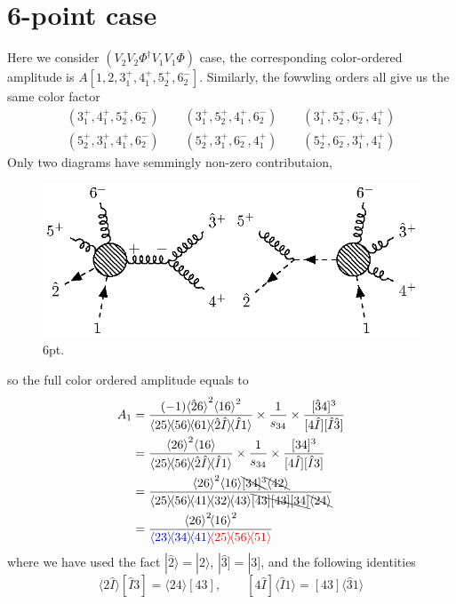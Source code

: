 \documentclass[12pt]{article}
\newcommand{\mdavg}[2]{\langle #1 \rangle\!\langle #2 \rangle}
\newcommand{\avg}[1]{\langle #1 \rangle}
\newcommand{\inavg}[2]{\langle #1 \rangle\! [#2]}
\newcommand{\rinavg}[2]{[#1]\!\langle #2 \rangle}
\newcommand{\aket}[1]{|#1\rangle}
\newcommand{\asqu}[1]{{\langle#1\rangle}^2}
\newcommand{\sket}[1]{|#1]}
\begin{document}
\section{6-point case}
Here we consider $(V_2V_2\Phi^\dagger V_1V_1 \Phi)$ case, the corresponding color-ordered amplitude is $A[1,2,3_1^+,4_1^+,5_2^+,6_2^-]$.
Similarly, the fowwling orders all give us the same color factor
\begin{gather*}
    (3_1^+,4_1^+,5_2^+,6_2^-)\qquad(3_1^+,5_2^+,4_1^+,6_2^-)\qquad (3_1^+,5_2^+,6_2^-,4_1^+)\\
    (5_2^+,3_1^+,4_1^+,6_2^-)\qquad(5_2^+,3_1^+,6_2^-,4_1^+)\qquad (5_2^+,6_2^-,3_1^+,4_1^+)
\end{gather*}
Only two diagrams have semmingly non-zero contributaion,
\par
\begin{figure}[H]
    \centering
    \includegraphics{6pt.eps}
    \caption{6pt.}
    \label{5}
\end{figure}
so the full color ordered amplitude equals to
\begin{align*}
    A_1&=\frac{(-1)\asqu{\hat{2}6}\asqu{16}}{\mdavg{25}{56}\!\avg{61}\!\mdavg{\hat{2}\hat{I}}{\hat{I}1}}\times\frac{1}{s_{34}}\times\frac{[\hat{3}4]^3}{[4\hat{I}][\hat{I}\hat{3}]}\\
    &=\frac{\asqu{26}\avg{16}}{\mdavg{25}{56}\!\mdavg{\hat{2}\hat{I}}{\hat{I}1}}\times\frac{1}{s_{34}}\times\frac{[34]^3}{[4\hat{I}][\hat{I}3]}\\
    &=\frac{\asqu{26}\avg{16}\bcancel{[34]^3}\bcancel{\avg{42}}}{\mdavg{25}{56}\!\mdavg{41}{32}\!\avg{43}\bcancel{[43][43][34]}\bcancel{\avg{24}}}\\
    &=\frac{\asqu{26}\!\asqu{16}}{\textcolor{blue}{\mdavg{23}{34}\!\avg{41}}\!\textcolor{red}{\mdavg{25}{56}\!\avg{51}}}
\end{align*}
where we have used the fact $\aket{\hat{2}}=\aket{2}$, $\sket{\hat{3}}=\sket{3}$, and the following identities
\begin{equation*}
    \inavg{2\hat{I}}{\hat{I}3}=\inavg{24}{43}, \qquad \rinavg{4\hat{I}}{\hat{I}1}=\rinavg{43}{\hat{3}1}
\end{equation*}
\end{document}
